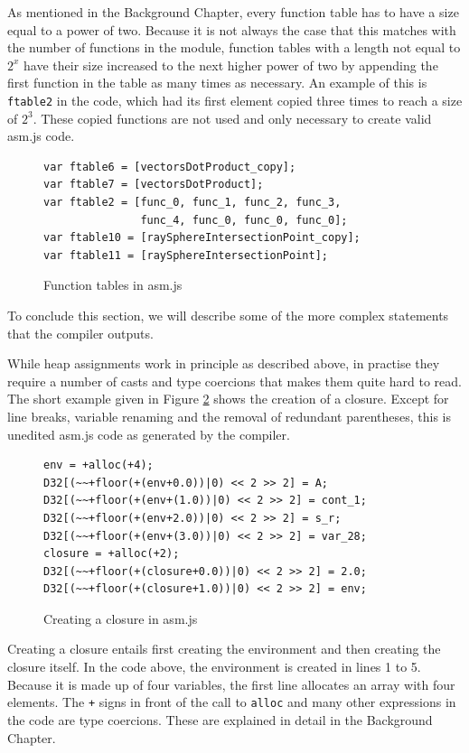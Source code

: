 \documentclass[11pt]{report}
\begin{document}
As mentioned in the Background Chapter, every function table has to have a size equal to a power of two. Because it is not always the case that this matches with the number of functions in the module, function tables with a length not equal to $2^x$ have their size increased to the next higher power of two by appending the first function in the table as many times as necessary. An example of this is \texttt{ftable2} in the code, which had its first element copied three times to reach a size of $2^3$. These copied functions are not used and only necessary to create valid asm.js code.

\begin{figure}[t]
\begin{lstlisting}
var ftable6 = [vectorsDotProduct_copy];
var ftable7 = [vectorsDotProduct];
var ftable2 = [func_0, func_1, func_2, func_3, 
               func_4, func_0, func_0, func_0];
var ftable10 = [raySphereIntersectionPoint_copy];
var ftable11 = [raySphereIntersectionPoint];
\end{lstlisting}
\caption{Function tables in asm.js}
\label{iasmjsmm6}
\end{figure}

To conclude this section, we will describe some of the more complex statements that the compiler outputs.

While heap assignments work in principle as described above, in practise they require a number of casts and type coercions that makes them quite hard to read. The short example given in Figure \ref{iasmjsmm7} shows the creation of a closure. Except for line breaks, variable renaming and the removal of redundant parentheses, this is unedited asm.js code as generated by the compiler.

\begin{figure}[ht]
\begin{lstlisting}
env = +alloc(+4);
D32[(~~+floor(+(env+0.0))|0) << 2 >> 2] = A;
D32[(~~+floor(+(env+(1.0))|0) << 2 >> 2] = cont_1;
D32[(~~+floor(+(env+2.0))|0) << 2 >> 2] = s_r;
D32[(~~+floor(+(env+(3.0))|0) << 2 >> 2] = var_28;
closure = +alloc(+2);
D32[(~~+floor(+(closure+0.0))|0) << 2 >> 2] = 2.0;
D32[(~~+floor(+(closure+1.0))|0) << 2 >> 2] = env;
\end{lstlisting}
\caption{Creating a closure in asm.js}
\label{iasmjsmm7}
\end{figure}

Creating a closure entails first creating the environment and then creating the closure itself. In the code above, the environment is created in lines 1 to 5. Because it is made up of four variables, the first line allocates an array with four elements. The \texttt{+} signs in front of the call to \texttt{alloc} and many other expressions in the code are type coercions. These are explained in detail in the Background Chapter.
\end{document}
